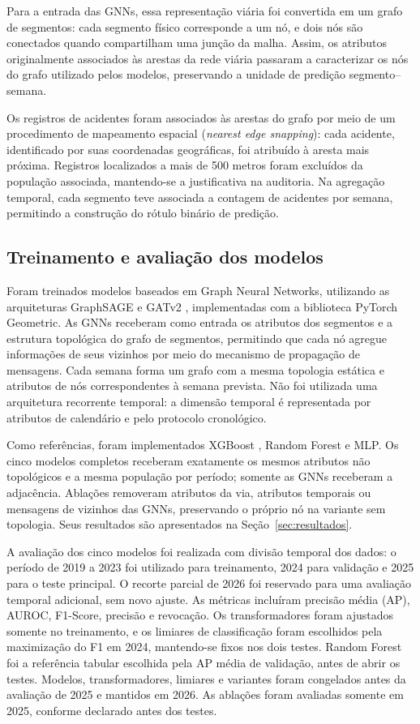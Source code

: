 \documentclass[12pt]{article}
\begin{document}
Para a entrada das GNNs, essa representação viária foi
convertida em um grafo de segmentos: cada segmento físico corresponde
a um nó, e dois nós são conectados quando compartilham uma junção
da malha. Assim, os atributos originalmente associados às arestas da
rede viária passaram a caracterizar os nós do grafo utilizado pelos
modelos, preservando a unidade de predição segmento--semana.

Os registros de acidentes foram associados às arestas do grafo por
meio de um procedimento de mapeamento espacial (\textit{nearest edge
snapping}): cada acidente, identificado por suas coordenadas
geográficas, foi atribuído à aresta mais próxima. Registros
localizados a mais de 500 metros foram excluídos da população
associada, mantendo-se a justificativa na auditoria. Na agregação
temporal, cada segmento teve associada a contagem de acidentes por semana,
permitindo a construção do rótulo binário de predição.

\subsection{Treinamento e avaliação dos modelos}

Foram treinados modelos baseados em Graph Neural Networks, utilizando
as arquiteturas GraphSAGE \cite{hamilton2017} e GATv2 \cite{brody2022},
implementadas com a biblioteca PyTorch Geometric. As GNNs receberam
como entrada os atributos dos segmentos e a estrutura topológica do
grafo de segmentos, permitindo que cada nó agregue informações de seus
vizinhos por meio do mecanismo de propagação de mensagens. Cada semana
forma um grafo com a mesma topologia estática e atributos de nós
correspondentes à semana prevista. Não foi utilizada uma arquitetura
recorrente temporal: a dimensão temporal é representada por atributos
de calendário e pelo protocolo cronológico.

Como referências, foram implementados XGBoost \cite{chen2016},
Random Forest \cite{breiman2001} e MLP. Os cinco modelos completos
receberam exatamente os mesmos atributos não topológicos e a mesma
população por período; somente as GNNs receberam a adjacência.
Ablações removeram atributos da via, atributos temporais ou mensagens
de vizinhos das GNNs, preservando o próprio nó na variante sem
topologia. Seus resultados são apresentados na
Seção~\ref{sec:resultados}.

A avaliação dos cinco modelos foi realizada com divisão
temporal dos dados: o período de 2019 a 2023 foi utilizado para
treinamento, 2024 para validação e 2025 para o teste principal. O
recorte parcial de 2026 foi reservado para uma avaliação temporal
adicional, sem novo ajuste. As métricas incluíram precisão média (AP),
AUROC, F1-Score, precisão e revocação. Os transformadores foram
ajustados somente no treinamento, e os limiares de classificação foram
escolhidos pela maximização do F1 em 2024, mantendo-se fixos nos dois
testes. Random Forest foi a referência tabular escolhida pela AP média
de validação, antes de abrir os testes. Modelos, transformadores,
limiares e variantes foram congelados antes da avaliação de 2025 e
mantidos em 2026. As ablações foram avaliadas somente em 2025,
conforme declarado antes dos testes.
\clearpage
\end{document}
